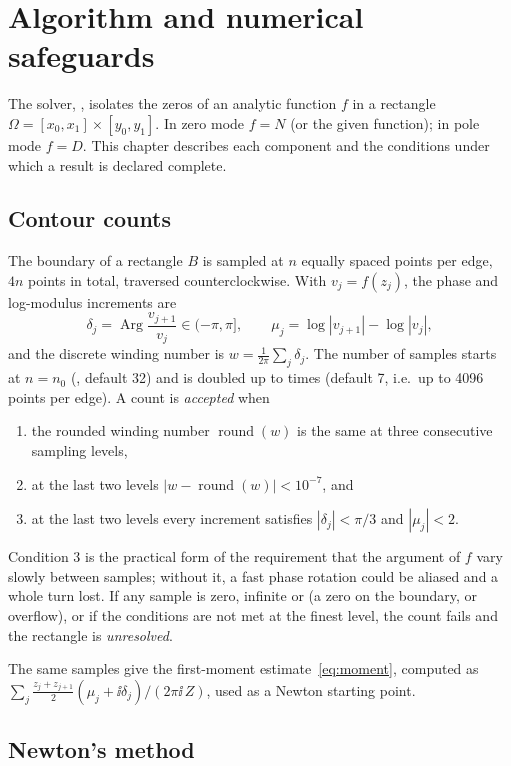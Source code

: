 \chapter{Algorithm and numerical safeguards}\label{ch:algorithm}

The solver, , isolates the zeros of an analytic
function $f$ in a rectangle $\Omega=[x_0,x_1]\times[y_0,y_1]$. In zero mode
$f=N$ (or the given function); in pole mode $f=D$. This chapter describes
each component and the conditions under which a result is declared
complete.

\section{Contour counts}\label{sec:count}

The boundary of a rectangle $B$ is sampled at $n$ equally spaced points per
edge, $4n$ points in total, traversed counterclockwise. With
$v_j=f(z_j)$, the phase and log-modulus increments are
\[
  \delta_j=\operatorname{Arg}\frac{v_{j+1}}{v_j}\in(-\pi,\pi],\qquad
  \mu_j=\log|v_{j+1}|-\log|v_j| ,
\]
and the discrete winding number is $w=\frac{1}{2\pi}\sum_j\delta_j$. The
number of samples starts at $n=n_0$ (, default 32) and
is doubled up to  times (default 7, i.e.\ up to
4096 points per edge). A count is \emph{accepted} when
\begin{enumerate}
  \item the rounded winding number $\operatorname{round}(w)$ is the same at
        three consecutive sampling levels,
  \item at the last two levels $|w-\operatorname{round}(w)|<10^{-7}$, and
  \item at the last two levels every increment satisfies $|\delta_j|<\pi/3$
        and $|\mu_j|<2$.
\end{enumerate}
Condition 3 is the practical form of the requirement that the argument of
$f$ vary slowly between samples; without it, a fast phase rotation could be
aliased and a whole turn lost. If any sample is zero, infinite or
 (a zero on the boundary, or overflow), or if the conditions are
not met at the finest level, the count fails and the rectangle is
\emph{unresolved}.

The same samples give the first-moment estimate~\eqref{eq:moment}, computed
as $\sum_j \tfrac{z_j+z_{j+1}}{2}(\mu_j+\ii\delta_j)/(2\pi\ii\,Z)$, used as a
Newton starting point.

\section{Newton's method}\label{sec:newton}


